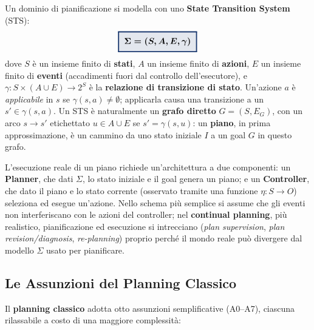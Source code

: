 \documentclass[a4paper,11pt]{article}
\newcommand{\keyeq}[1]{{\setlength{\fboxsep}{6pt}\setlength{\fboxrule}{1.3pt}\fcolorbox{iablue}{iablue!12}{\boldmath$\displaystyle #1$}}}
\begin{document}
Un dominio di pianificazione si modella con uno \textbf{State Transition System} (STS):
\[
\keyeq{\Sigma = (S,A,E,\gamma)}
\]
dove $S$ è un insieme finito di \textbf{stati}, $A$ un insieme finito di \textbf{azioni}, $E$ un insieme finito di \textbf{eventi} (accadimenti fuori dal controllo dell'esecutore), e $\gamma:S\times(A\cup E)\to 2^S$ è la \textbf{relazione di transizione di stato}. Un'azione $a$ è \emph{applicabile} in $s$ se $\gamma(s,a)\neq\emptyset$; applicarla causa una transizione a un $s'\in\gamma(s,a)$. Un STS è naturalmente un \textbf{grafo diretto} $G=(S,E_G)$, con un arco $s\to s'$ etichettato $u\in A\cup E$ se $s'=\gamma(s,u)$: un \textbf{piano}, in prima approssimazione, è un cammino da uno stato iniziale $I$ a un goal $G$ in questo grafo.

L'esecuzione reale di un piano richiede un'architettura a due componenti: un \textbf{Planner}, che dati $\Sigma$, lo stato iniziale e il goal genera un piano; e un \textbf{Controller}, che dato il piano e lo stato corrente (osservato tramite una funzione $\eta:S\to O$) seleziona ed esegue un'azione. Nello schema più semplice si assume che gli eventi non interferiscano con le azioni del controller; nel \textbf{continual planning}, più realistico, pianificazione ed esecuzione si intrecciano (\emph{plan supervision}, \emph{plan revision/diagnosis}, \emph{re-planning}) proprio perché il mondo reale può divergere dal modello $\Sigma$ usato per pianificare.

\subsection{Le Assunzioni del Planning Classico}

Il \textbf{planning classico} adotta otto assunzioni semplificative (A0--A7), ciascuna rilassabile a costo di una maggiore complessità:
\end{document}
